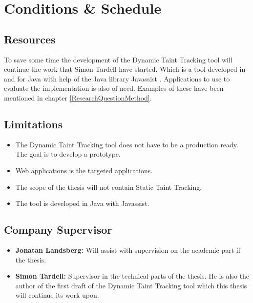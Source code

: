 \documentclass{../kththesis}
\begin{document}
	
	
	\chapter{Conditions \& Schedule}
	\section{Resources}
	To save some time the development of the Dynamic Taint Tracking tool will continue the work that Simon Tardell have started. Which is a tool developed in and for Java with help of the Java library Javassist \parencite{Javassist}. Applications to use to evaluate the implementation is also of need. Examples of these have been mentioned in chapter \ref{ResearchQuestionMethod}.
	
	
	\section{Limitations}
	\begin{itemize}  
		\item The Dynamic Taint Tracking tool does not have to be a production ready. The goal is to develop a prototype.
		\item Web applications is the targeted applications.
		\item The scope of the thesis will not contain Static Taint Tracking.
		\item The tool is developed in Java with Javassist.
	\end{itemize}
	
	
	\section{Company Supervisor}
	\begin{itemize}
		\item \textbf{Jonatan Landsberg:} Will assist with supervision on the academic part if the thesis.
		\item \textbf{Simon Tardell:} Supervisor in the technical parts of the thesis. He is also the author of the first draft of the Dynamic Taint Tracking tool which this thesis will continue its work upon. 
	\end{itemize}
	
\end{document}
